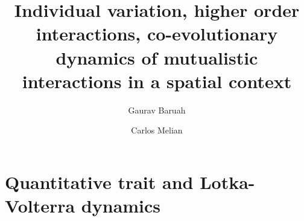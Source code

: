 \documentclass{elsarticle}
\renewcommand{\baselinestretch}{1.5}
\begin{document}
\begin{frontmatter}


\title{Individual variation, higher order interactions, co-evolutionary dynamics of mutualistic interactions in a spatial context}



\author[add1]{Gaurav Baruah}
\author[add2]{Carlos Melian}









\end{frontmatter}


\renewcommand{\baselinestretch}{1.25} 



\section{Quantitative trait and Lotka-Volterra dynamics}
\end{document}
